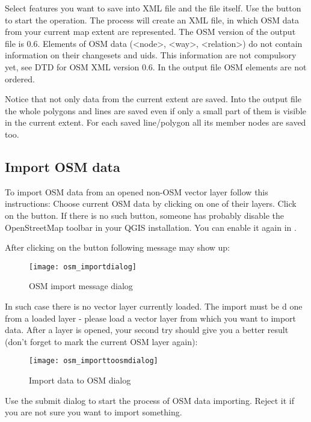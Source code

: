 Select features you want to save into XML file and the file itself. Use
the  button to start the operation. The process will create an
XML file, in which OSM data from your current map extent are represented.
The OSM version of the output file is 0.6. Elements of OSM data
(<node>, <way>, <relation>) do not contain information on their changesets
and uids. This information are not compulsory yet, see DTD for
OSM XML version 0.6. In the output file OSM elements are not ordered.

Notice that not only data from the current extent are saved. Into the output
file the whole polygons and lines are saved even if only a small part of them
is visible in the current extent. For each saved line/polygon all its member
nodes are saved too.

\subsection{Import OSM data}

To import OSM data from an opened non-OSM vector layer follow this
instructions: Choose current OSM data by clicking on one of their layers.
Click on the  button. If
there is no such button, someone has probably disable the OpenStreetMap
toolbar in your QGIS installation. You can enable it again in
 \arrow {} \arrow {}.

After clicking on the button following message may show up:

\begin{figure}[ht]
   \centering
   \texttt{[image: osm\_importdialog]}
   \caption{OSM import message dialog \nixcaption}\label{fig:osmimportmessage}
\end{figure}

In such case there is no vector layer currently loaded. The import must be d
one from a loaded layer - please load a vector layer from which you want to
import data. After a layer is opened, your second try should give you a
better result (don't forget to mark the current OSM layer again):

\begin{figure}[ht]
   \centering
   \texttt{[image: osm\_importtoosmdialog]}
   \caption{Import data to OSM dialog \nixcaption}\label{fig:osmimporttoosm}
\end{figure}

Use the submit dialog to start the process of OSM data importing.
Reject it if you are not sure you want to import something.

\FloatBarrier

